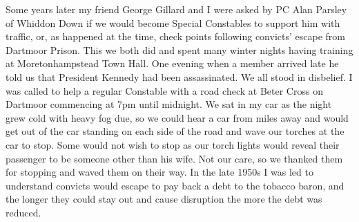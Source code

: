 Some years later my friend George Gillard and I were asked by PC Alan Parsley of
Whiddon Down if we would become Special Constables to support him with traffic,
or, as happened at the time, check points following convicts' escape from
Dartmoor Prison. This we both did and spent many winter nights having training
at Moretonhampstead Town Hall. One evening when a member arrived late he told
us that President Kennedy had been assassinated. We all stood in disbelief. I
was called to help a regular Constable with a road check at Beter Cross on
Dartmoor commencing at 7pm until midnight. We sat in my car as the night grew
cold with heavy fog due, so we could hear a car from miles away and would get
out of the car standing on each side of the road and wave our torches at the
car to stop. Some would not wish to stop as our torch lights would reveal their
passenger to be someone other than his wife. Not our care, so we thanked them
for stopping and waved them on their way. In the late 1950s I was led to
understand convicts would escape to pay back a debt to the tobacco baron, and
the longer they could stay out and cause disruption the more the debt was
reduced.
